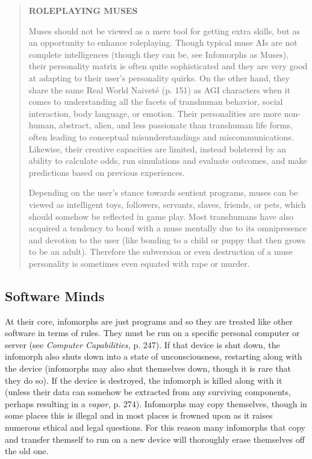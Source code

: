 \begin{quotation} \textbf{ROLEPLAYING MUSES} 

Muses should not be viewed as a mere tool for getting extra skills, but as an opportunity to enhance roleplaying. Though typical muse AIs are not complete intelligences (though they can be, see Infomorphs as Muses), their personality matrix is often quite sophisticated and they are very good at adapting to their user’s personality quirks. On the other hand, they share the same Real World Naiveté (p. 151) as AGI characters when it comes to understanding all the facets of transhuman behavior, social interaction, body language, or emotion. Their personalities are more non-human, abstract, alien, and less passionate than transhuman life forms, often leading to conceptual misunderstandings and miscommunications. Likewise, their creative capacities are limited, instead bolstered by an ability to calculate odds, run simulations and evaluate outcomes, and make predictions based on previous experiences. 

Depending on the user’s stance towards sentient programs, muses can be viewed as intelligent toys, followers, servants, slaves, friends, or pets, which should somehow be reflected in game play. Most transhumans have also acquired a tendency to bond with a muse mentally due to its omnipresence and devotion to the user (like bonding to a child or puppy that then grows to be an adult). Therefore the subversion or even destruction of a muse personality is sometimes even equated with rape or murder. \end{quotation} 



\subsection{Software Minds} 

At their core, infomorphs are just programs and so they are treated like other software in terms of rules. They must be run on a specific personal computer or server (see \textit{Computer Capabilities,} p. 247). If that device is shut down, the infomorph also shuts down into a state of unconsciousness, restarting along with the device (infomorphs may also shut themselves down, though it is rare that they do so). If the device is destroyed, the infomorph is killed along with it (unless their data can somehow be extracted from any surviving components, perhaps resulting in a \textit{vapor,} p. 274). Infomorphs may copy themselves, though in some places this is illegal and in most places is frowned upon as it raises numerous ethical and legal questions. For this reason many infomorphs that copy and transfer themself to run on a new device will thoroughly erase themselves off the old one. 

